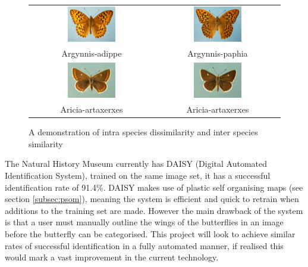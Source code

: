 \documentclass[11pt, titlepage, oneside]{article}
\theoremstyle{plain}
\theoremstyle{definition}
\theoremstyle{remark}
\begin{document}
		\begin{figure}[H]
			\centering
			\begin{tabular}{cc}
				\includegraphics[width=0.4\textwidth]{Argynnis-adippe-05.jpg} &
				\includegraphics[width=0.4\textwidth]{Argynnis-paphia-05.jpg} \\
				Argynnis-adippe & Argynnis-paphia \\
				\includegraphics[width=0.4\textwidth]{Aricia-artaxerxes-08.jpg}&
				\includegraphics[width=0.4\textwidth]{Aricia-artaxerxes-05.jpg}\\
				Aricia-artaxerxes & Aricia-artaxerxes
			\end{tabular}
			\caption{A demonstration of intra species dissimilarity and inter species similarity}
			\label{fig:difference}
		\end{figure}	

	\noindent The Natural History Museum currently has DAISY (Digital Automated Identification System), trained on the same image set, it has a successful identification rate of 91.4\%\cite{overview}. DAISY makes use of plastic self organising maps (see section \ref{subsec:psom}), meaning the system is efficient and quick to retrain when additions to the training set are made. However the main drawback of the system is that a user must manually outline the wings of the butterflies in an image before the butterfly can be categorised. This project will look to achieve similar rates of successful identification in a fully automated manner, if realised this would mark a vast improvement in the current technology\cite{DAISY}. \\
\end{document}

